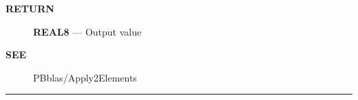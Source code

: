 \par
\begin{description}
\item [\colorbox{tagtype}{\color{white} \textbf{\textsf{RETURN}}}] \textbf{REAL8} --- Output value
\end{description}






\par
\begin{description}
\item [\colorbox{tagtype}{\color{white} \textbf{\textsf{SEE}}}] PBblas/Apply2Elements
\end{description}




\rule{\linewidth}{0.5pt}
